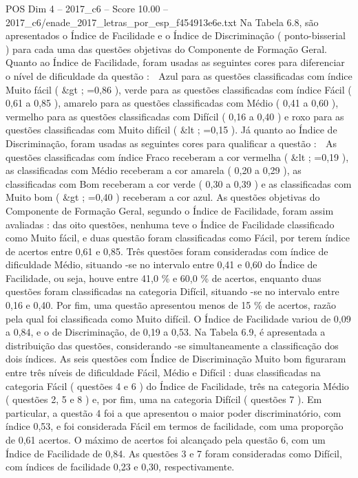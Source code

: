 \begin{textsample}{POS Dim 4 – 2017\_c6 – Score 10.00 – 2017\_c6/enade\_2017\_letras\_por\_esp\_f454913e6e.txt}
Na Tabela 6.8, são apresentados o Índice de Facilidade e o Índice de Discriminação ( ponto-bisserial ) para cada uma das questões objetivas do Componente de Formação Geral.
Quanto ao Índice de Facilidade, foram usadas as seguintes cores para diferenciar o nível de dificuldade da questão :  Azul para as questões classificadas com índice Muito fácil ( \&gt ; =0,86 ), verde para as questões classificadas com índice Fácil ( 0,61 a 0,85 ), amarelo para as questões classificadas com Médio ( 0,41 a 0,60 ), vermelho para as questões classificadas com Difícil ( 0,16 a 0,40 ) e roxo para as questões classificadas com Muito difícil ( \&lt ; =0,15 ).
Já quanto ao Índice de Discriminação, foram usadas as seguintes cores para qualificar a questão :  As questões classificadas com índice Fraco receberam a cor vermelha ( \&lt ; =0,19 ), as classificadas com Médio receberam a cor amarela ( 0,20 a 0,29 ), as classificadas com Bom receberam a cor verde ( 0,30 a 0,39 ) e as classificadas com Muito bom ( \&gt ; =0,40 ) receberam a cor azul.
As questões objetivas do Componente de Formação Geral, segundo o Índice de Facilidade, foram assim avaliadas : das oito questões, nenhuma teve o Índice de Facilidade classificado como Muito fácil, e duas questão foram classificadas como Fácil, por terem índice de acertos entre 0,61 e 0,85.
Três questões foram consideradas com índice de dificuldade Médio, situando -se no intervalo entre 0,41 e 0,60 do Índice de Facilidade, ou seja, houve entre 41,0 \% e 60,0 \% de acertos, enquanto duas questões foram classificadas na categoria Difícil, situando -se no intervalo entre 0,16 e 0,40.
Por fim, uma questão apresentou menos de 15 \% de acertos, razão pela qual foi classificada como Muito difícil.
O Índice de Facilidade variou de 0,09 a 0,84, e o de Discriminação, de 0,19 a 0,53.
Na Tabela 6.9, é apresentada a distribuição das questões, considerando -se simultaneamente a classificação dos dois índices.
As seis questões com Índice de Discriminação Muito bom figuraram entre três níveis de dificuldade Fácil, Médio e Difícil : duas classificadas na categoria Fácil ( questões 4 e 6 ) do Índice de Facilidade, três na categoria Médio ( questões 2, 5 e 8 ) e, por fim, uma na categoria Difícil ( questões 7 ).
Em particular, a questão 4 foi a que apresentou o maior poder discriminatório, com índice 0,53, e foi considerada Fácil em termos de facilidade, com uma proporção de 0,61 acertos.
O máximo de acertos foi alcançado pela questão 6, com um Índice de Facilidade de 0,84.
As questões 3 e 7 foram consideradas como Difícil, com índices de facilidade 0,23 e 0,30, respectivamente.

\end{textsample}
